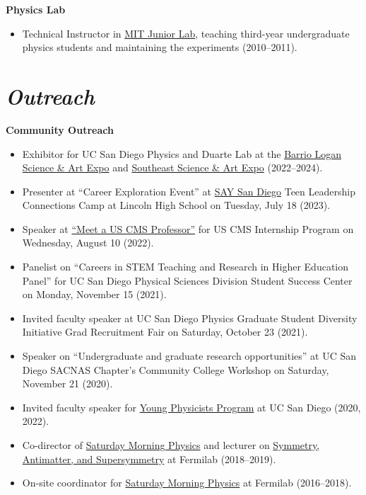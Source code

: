 \documentclass[11pt]{res}
\newcommand{\MarginText}[1]{\section{\textit{#1}}}
\begin{document}
\begin{resume}
  \textbf{Physics Lab}
  \begin{itemize}
    \itemsep-0.3em
    \item Technical Instructor in \href{http://web.mit.edu/8.13/www/index.shtml}{MIT Junior Lab}, teaching third-year undergraduate physics students and maintaining the experiments ({2010--2011}).
  \end{itemize}


  \MarginText{Outreach}
  \textbf{Community Outreach}
  \begin{itemize}
    \itemsep-0.3em
    \item Exhibitor for UC San Diego Physics and Duarte Lab at the \href{https://www.barriologansae.com/}{Barrio Logan Science \& Art Expo} and \href{https://www.southeastsdsteamexpo.com/}{Southeast Science \& Art Expo} ({2022--2024}).
    \item Presenter at ``Career Exploration Event'' at \href{https://saysandiego.org}{SAY San Diego} Teen Leadership Connections Camp at Lincoln High School on Tuesday, July 18 (2023).
    \item Speaker at \href{https://indico.cern.ch/event/1167965/timetable/#93-meet-a-uscms-professorscien}{``Meet a US CMS Professor''} for US CMS Internship Program on Wednesday, August 10 (2022).
    \item Panelist on ``Careers in STEM Teaching and Research in Higher Education Panel'' for UC San Diego Physical Sciences Division Student Success Center on Monday, November 15 ({2021}).
    \item Invited faculty speaker at UC San Diego Physics Graduate Student Diversity Initiative Grad Recruitment Fair on Saturday, October 23 ({2021}).
    \item Speaker on ``Undergraduate and graduate research opportunities'' at UC San Diego SACNAS Chapter's Community College Workshop on Saturday, November 21 ({2020}).
    \item Invited faculty speaker for \href{http://ypp.ucsd.edu/}{Young Physicists Program} at UC San Diego ({2020}, 2022).
    \item Co-director of \href{http://saturdaymorningphysics.fnal.gov/}{Saturday Morning Physics} and lecturer on \href{http://saturdaymorningphysics.fnal.gov/fall-session-2018/}{Symmetry, Antimatter, and Supersymmetry} at Fermilab ({2018--2019}).
    \item On-site coordinator for \href{http://saturdaymorningphysics.fnal.gov/}{Saturday Morning Physics} at Fermilab ({2016--2018}).
  \end{itemize}


\end{resume}
\end{document}
